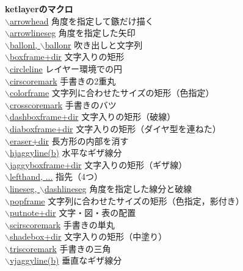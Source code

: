 \documentclass[a4j,12pt,dvipdfmx]{ujarticle}
\newcommand{\bs}{$\backslash$}
\begin{document}
\begin{tabbing}
{\bf ketlayerのマクロ} \> \\
\hyperlink{arrowhead}{\bs arrowhead} \> 角度を指定して鏃だけ描く\\
\hyperlink{arrowlineseg}{\bs arrowlineseg} \> 角度を指定した矢印\\
\hyperlink{ballonl}{\bs ballonl, \bs ballonr} \> 吹き出しと文字列\\
\hyperlink{boxframe}{\bs boxframe+dir} \> 文字入りの矩形\\
\hyperlink{circleline}{\bs circleline} \> レイヤー環境での円\\
\hyperlink{cirscoremark}{\bs cirscoremark} \> 手書きの2重丸\\
\hyperlink{colorframe}{\bs colorframe} \> 文字列に合わせたサイズの矩形（色指定）\\
\hyperlink{crosscoremark}{\bs crosscoremark} \> 手書きのバツ\\
\hyperlink{dashboxframe}{\bs dashboxframe+dir} \> 文字入りの矩形（破線）\\
\hyperlink{diaboxframe}{\bs diaboxframe+dir} \> 文字入りの矩形（ダイヤ型を連ねた）\\
\hyperlink{eraser}{\bs eraser+dir} \> 長方形の内部を消す\\
\hyperlink{hjaggyline}{\bs hjaggyline(b)} \> 水平なギザ線分\\
\hyperlink{jaggyboxframe}{\bs jaggyboxframe+dir} \> 文字入りの矩形（ギザ線）\\
\hyperlink{lefthand}{\bs lefthand, ...} \> 指先（4つ）\\
\hyperlink{lineseg}{\bs lineseg, \bs dashlineseg} \> 角度を指定した線分と破線\\
\hyperlink{popframe}{\bs popframe} \> 文字列に合わせたサイズの矩形（色指定，影付き）\\
\hyperlink{putnote}{\bs putnote+dir} \> 文字・図・表の配置\\
\hyperlink{scirscoremark}{\bs scirscoremark} \> 手書きの単丸\\
\hyperlink{shadebox}{\bs shadebox+dir} \> 文字入りの矩形（中塗り）\\
\hyperlink{triscoremark}{\bs triscoremark} \> 手書きの三角\\
\hyperlink{vjaggyline}{\bs vjaggyline(b)} \> 垂直なギザ線分\\


\end{tabbing}
\end{document}
